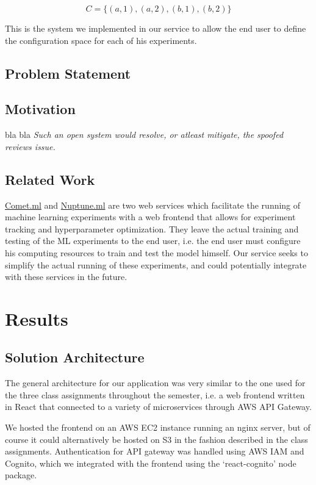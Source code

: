 \documentclass[12pt,oneside]{amsart}
\makeatletter
\newcommand*\ie{i.e.\@\xspace}
\makeatother
\begin{document}
\begin{multicols}{2}
\[
C = \{(a, 1), (a, 2), (b, 1), (b, 2)\}
\]

This is the system we implemented in our service to allow the end user to define the configuration space for each of his experiments.

\subsection{Problem Statement} \label{ch:problem_statement}

\subsection{Motivation} \label{ch:motivation}
bla bla \textit{Such an open system would resolve, or atleast mitigate, the spoofed reviews issue.}

\subsection{Related Work} \label{ch:previous}
\href{https://comet.ml/}{Comet.ml} and \href{https://neptune.ml/}{Nuptune.ml} are two web services which facilitate the running of machine learning experiments with a web frontend that allows for experiment tracking and hyperparameter optimization.
They leave the actual training and testing of the ML experiments to the end user, \ie the end user must configure his computing resources to train and test the model himself.
Our service seeks to simplify the actual running of these experiments, and could potentially integrate with these services in the future.

\section{Results} \label{ch:results}
\subsection{Solution Architecture}
The general architecture for our application was very similar to the one used for the three class assignments throughout the semester,
\ie a web frontend written in React that connected to a variety of microservices through AWS API Gateway.

We hosted the frontend on an AWS EC2 instance running an nginx server, but of course it could alternatively be hosted on S3 in the fashion described in the class assignments.
Authentication for API gateway was handled using AWS IAM and Cognito, which we integrated with the frontend using the `react-cognito' node package.


\end{multicols}
\end{document}
